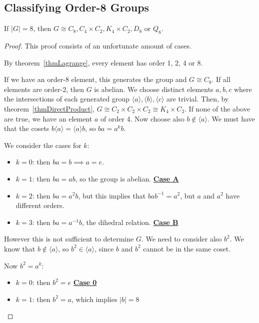 \documentclass[../Main.tex]{subfiles}
\begin{document}
\subsection{Classifying Order-8 Groups}
\begin{lemma}
    If $|G| = 8$, then $G \cong C_8, C_4 \times C_2, K_4 \times C_2, D_8$ or $Q_8$.
\end{lemma}
\begin{proof}
    This proof consists of an unfortunate amount of cases.\par
    By theorem~\ref{thmLagrange}, every element has order 1, 2, 4 or 8.\par
    If we have an order-8 element, this generates the group and $G \cong C_8$. If all elements are order-2, then $G$ is abelian. We choose distinct elements $a, b, c$ where the intersections of each generated group $\langle a \rangle, \langle b \rangle, \langle c \rangle$ are trivial. Then, by theorem~\ref{thmDirectProduct}, $G \cong C_2 \times C_2 \times C_2 \cong K_4 \times C_2$.
    If none of the above are true, we have an element $a$ of order 4. Now choose also $b \notin \langle a \rangle$. We must have that the cosets $b \langle a \rangle = \langle a \rangle b$, so $ba = a^k b$.\par
    We consider the cases for $k$:
    \begin{itemize}
        \item \underline{$k = 0$}: then $b a = b \implies a = e$. \contradiction
        \item \underline{$k = 1$}: then $ba = ab$, so the group is abelian. \underline{\textbf{Case A}}
        \item \underline{$k = 2$}: then $ba = a^2 b$, but this implies that $b a b^{-1} = a^2$, but $a$ and $a^2$ have different orders. \contradiction
        \item \underline{$k = 3$}: then $ba = a^{-1} b$, the dihedral relation. \underline{\textbf{Case B}}
    \end{itemize}
    However this is not sufficient to determine $G$. We need to consider also $b^2$. We know that $b \notin \langle a \rangle$, so $b^2 \in \langle a \rangle$, since $b$ and $b^2$ cannot be in the same coset.\par
    Now $b^2 = a^k$:
    \begin{itemize}
        \item \underline{$k = 0$}: then $b^2 = e$ \underline{\textbf{Case 0}}
        \item \underline{$k = 1$}: then $b^2 = a$, which implies $|b| =  8$ \contradiction

\end{itemize}
\end{proof}
\end{document}
